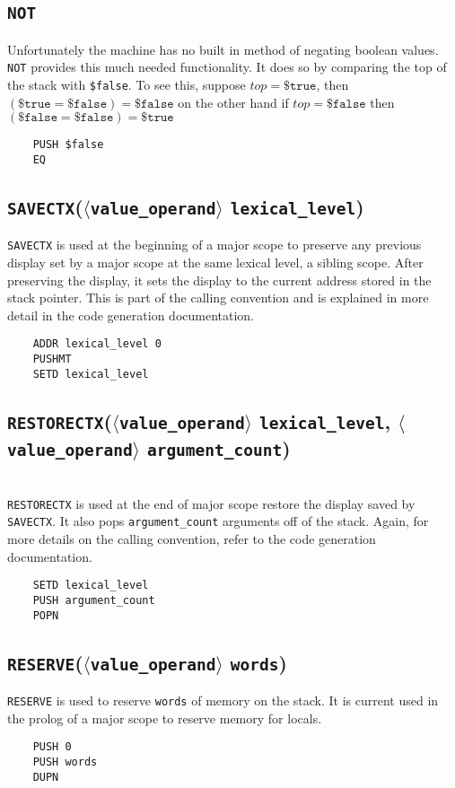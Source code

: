\documentclass[oneside]{amsart}
\theoremstyle{definition}
\theoremstyle{remark}
\numberwithin{equation}{section}
\begin{document}
\subsection{\texttt{NOT}}
Unfortunately the machine has no built in method of negating boolean values. \texttt{NOT} provides
this much needed functionality. It does so by comparing the top of the stack with \texttt{\$false}.
To see this, suppose $top = \texttt{\$true}$, then $(\texttt{\$true} = \texttt{\$false}) =
\texttt{\$false}$ on the other hand if $top = \texttt{\$false}$ then $(\texttt{\$false} =
\texttt{\$false}) = \texttt{\$true}$
\begin{lstlisting}
    PUSH $false
    EQ
\end{lstlisting}

\newpage

\subsection{\texttt{SAVECTX}(\texttt{$\langle$value_operand$\rangle$} \texttt{lexical_level})}
\texttt{SAVECTX} is used at the beginning of a major scope to preserve any previous display set by
a major scope at the same lexical level, a sibling scope. After preserving the display, it sets the
display to the current address stored in the stack pointer. This is part of the calling convention
and is explained in more detail in the code generation documentation.
\begin{lstlisting}
    ADDR lexical_level 0
    PUSHMT
    SETD lexical_level
\end{lstlisting}
\subsection{\texttt{RESTORECTX}(\texttt{$\langle$value_operand$\rangle$} \texttt{lexical_level},
\texttt{$\langle$value_operand$\rangle$} \texttt{argument_count})} \ \\
\texttt{RESTORECTX} is used at the end of major scope restore the display saved by \texttt{SAVECTX}.
It also pops \texttt{argument_count} arguments off of the stack. Again, for more details on the
calling convention, refer to the code generation documentation.
\begin{lstlisting}
    SETD lexical_level
    PUSH argument_count
    POPN
\end{lstlisting}
\subsection{\texttt{RESERVE}(\texttt{$\langle$value_operand$\rangle$} \texttt{words})}
\texttt{RESERVE} is used to reserve \texttt{words} of memory on the stack. It is current used in the
prolog of a major scope to reserve memory for locals.
\begin{lstlisting}
    PUSH 0 
    PUSH words
    DUPN
\end{lstlisting}
\end{document}
